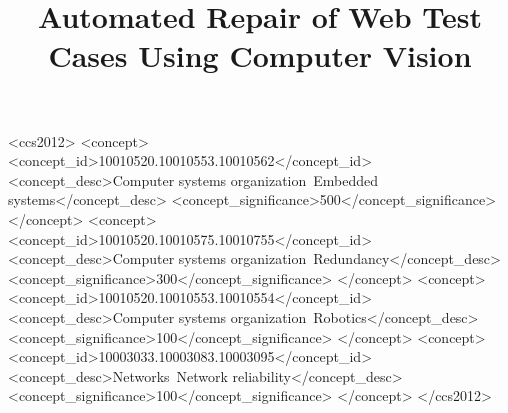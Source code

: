 \documentclass[sigconf,review,anonymous]{acmart}
\begin{document}
\title{Automated Repair of Web Test Cases Using Computer Vision}


%
%





\begin{abstract}

\end{abstract}

%
%
\begin{CCSXML}
<ccs2012>
 <concept>
  <concept_id>10010520.10010553.10010562</concept_id>
  <concept_desc>Computer systems organization~Embedded systems</concept_desc>
  <concept_significance>500</concept_significance>
 </concept>
 <concept>
  <concept_id>10010520.10010575.10010755</concept_id>
  <concept_desc>Computer systems organization~Redundancy</concept_desc>
  <concept_significance>300</concept_significance>
 </concept>
 <concept>
  <concept_id>10010520.10010553.10010554</concept_id>
  <concept_desc>Computer systems organization~Robotics</concept_desc>
  <concept_significance>100</concept_significance>
 </concept>
 <concept>
  <concept_id>10003033.10003083.10003095</concept_id>
  <concept_desc>Networks~Network reliability</concept_desc>
  <concept_significance>100</concept_significance>
 </concept>
</ccs2012>  
\end{CCSXML}



\keywords{}

\maketitle










\balance
%


\end{document}
